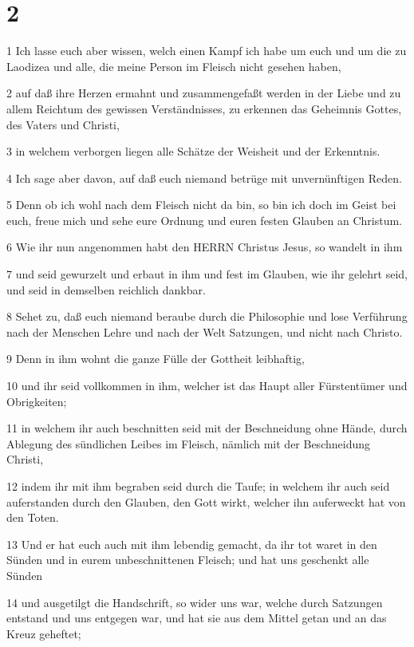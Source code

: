 \chapter{2}

\par 1 Ich lasse euch aber wissen, welch einen Kampf ich habe um euch und um die zu Laodizea und alle, die meine Person im Fleisch nicht gesehen haben,
\par 2 auf daß ihre Herzen ermahnt und zusammengefaßt werden in der Liebe und zu allem Reichtum des gewissen Verständnisses, zu erkennen das Geheimnis Gottes, des Vaters und Christi,
\par 3 in welchem verborgen liegen alle Schätze der Weisheit und der Erkenntnis.
\par 4 Ich sage aber davon, auf daß euch niemand betrüge mit unvernünftigen Reden.
\par 5 Denn ob ich wohl nach dem Fleisch nicht da bin, so bin ich doch im Geist bei euch, freue mich und sehe eure Ordnung und euren festen Glauben an Christum.
\par 6 Wie ihr nun angenommen habt den HERRN Christus Jesus, so wandelt in ihm
\par 7 und seid gewurzelt und erbaut in ihm und fest im Glauben, wie ihr gelehrt seid, und seid in demselben reichlich dankbar.
\par 8 Sehet zu, daß euch niemand beraube durch die Philosophie und lose Verführung nach der Menschen Lehre und nach der Welt Satzungen, und nicht nach Christo.
\par 9 Denn in ihm wohnt die ganze Fülle der Gottheit leibhaftig,
\par 10 und ihr seid vollkommen in ihm, welcher ist das Haupt aller Fürstentümer und Obrigkeiten;
\par 11 in welchem ihr auch beschnitten seid mit der Beschneidung ohne Hände, durch Ablegung des sündlichen Leibes im Fleisch, nämlich mit der Beschneidung Christi,
\par 12 indem ihr mit ihm begraben seid durch die Taufe; in welchem ihr auch seid auferstanden durch den Glauben, den Gott wirkt, welcher ihn auferweckt hat von den Toten.
\par 13 Und er hat euch auch mit ihm lebendig gemacht, da ihr tot waret in den Sünden und in eurem unbeschnittenen Fleisch; und hat uns geschenkt alle Sünden
\par 14 und ausgetilgt die Handschrift, so wider uns war, welche durch Satzungen entstand und uns entgegen war, und hat sie aus dem Mittel getan und an das Kreuz geheftet;
